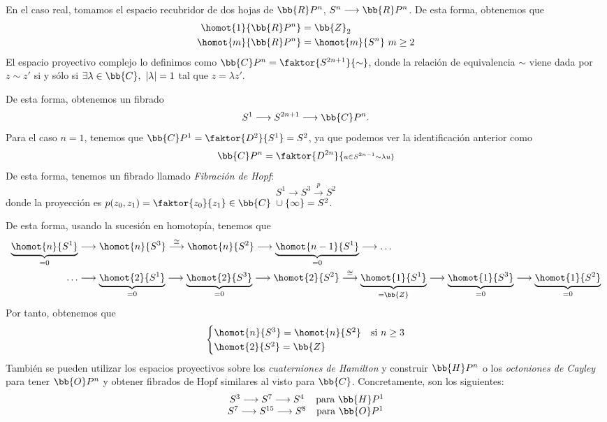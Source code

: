 \begin{enumerate}
En el caso real, tomamos el espacio recubridor de dos hojas de $\bb{R}P^n$, $S^n \longrightarrow \bb{R}P^n$. De esta forma, obtenemos que 
\begin{align*}
\homot{1}{\bb{R}P^n} &= \bb{Z}_2 \\
\homot{m}{\bb{R}P^n} &= \homot{m}{S^n} \ m \geq 2
\end{align*}
El espacio proyectivo complejo lo definimos como $\bb{C}P^n = \faktor{S^{2n+1}}{\sim}$, donde la relación de equivalencia $\sim$ viene dada por $z \sim z'$ si y sólo si $\exists \lambda \in \bb{C}, \ |\lambda| = 1$ tal que $z = \lambda z'$. \par
De esta forma, obtenemos un fibrado
\[
S^1 \longrightarrow S^{2n+1} \longrightarrow \bb{C}P^n.
\]
Para el caso $n = 1$, tenemos que $\bb{C}P^1 = \faktor{D^2}{S^1} = S^2$, ya que podemos ver la identificación anterior como 
\[
\bb{C}P^n = \faktor{D^{2n}}{\scriptstyle u \in S^{2n-1} \sim \lambda u}
\]
De esta forma, tenemos un fibrado llamado \textit{Fibración de Hopf}:
\[
S^1 \longrightarrow S^3 \stackrel{p}{\longrightarrow} S^2
\]
donde la proyección es $p(z_0, z_1) = \faktor{z_0}{z_1} \in \bb{C} \ \cup \{\infty \} = S^2$. \par
De esta forma, usando la sucesión en homotopía, tenemos que 
\begin{align*}
\underbrace{\homot{n}{S^1}}_{\text{=0}} &\longrightarrow \homot{n}{S^3} \stackrel{\cong}{\longrightarrow} \homot{n}{S^2} \longrightarrow \underbrace{\homot{n-1}{S^1}}_{\text{=0}} \longrightarrow \dots \\ 
\dots &\longrightarrow \underbrace{\homot{2}{S^1}}_{\text{=0}} \longrightarrow \underbrace{\homot{2}{S^3}}_{\text{=0}} \longrightarrow \homot{2}{S^2} \stackrel{\cong}{\longrightarrow} \underbrace{\homot{1}{S^1}}_{\text{=}\bb{Z}} \longrightarrow \underbrace{\homot{1}{S^3}}_{\text{=0}} \longrightarrow \underbrace{\homot{1}{S^2}}_{\text{=0}}
\end{align*}
Por tanto, obtenemos que
\[
\begin{cases}
\homot{n}{S^3} = \homot{n}{S^2} & \text{si } n \geq 3 \\
\homot{2}{S^2} = \bb{Z}
\end{cases}
\]
También se pueden utilizar los espacios proyectivos sobre los \textit{cuaterniones de Hamilton} y construir $\bb{H}P^n$ o los \textit{octoniones de Cayley} para tener $\bb{O}P^n$ y obtener fibrados de Hopf similares al visto para  $\bb{C}$. Concretamente, son los siguientes:
\[
\begin{matrix}
S^3 \longrightarrow S^7 \longrightarrow S^4 & \text{para } \bb{H}P^1 \\
S^7 \longrightarrow S^{15} \longrightarrow S^8 & \text{para } \bb{O}P^1
\end{matrix}
\]
\end{enumerate}